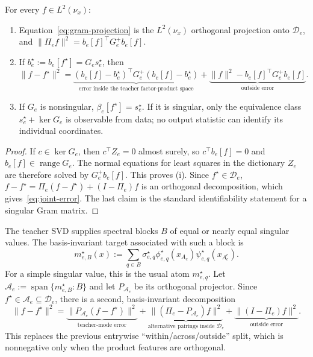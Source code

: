 \begin{proposition}\label{prop:error-decomposition}
For every $f\in L^2(\nu_x)$:
\begin{enumerate}[label=(\roman*),nosep]
\item Equation~\eqref{eq:gram-projection} is the $L^2(\nu_x)$ orthogonal projection onto
      $\mathcal D_e$, and
      $\|\Pi_e f\|^2=b_e[f]^\top G_e^+b_e[f]$.
\item If $b_e^\star:=b_e[f^\star]=G_es_e^\star$, then
\begin{equation}\label{eq:joint-error}
 \|f-f^\star\|^2
 =\underbrace{(b_e[f]-b_e^\star)^\top G_e^+(b_e[f]-b_e^\star)}_{\text{error inside the teacher factor-product space}}
 +\underbrace{\|f\|^2-b_e[f]^\top G_e^+b_e[f]}_{\text{outside error}}.
\end{equation}
\item If $G_e$ is nonsingular, $\beta_e[f^\star]=s_e^\star$.  If it is singular, only the
      equivalence class $s_e^\star+\ker G_e$ is observable from data; no output statistic can
      identify its individual coordinates.
\end{enumerate}
\end{proposition}

\begin{proof}
If $c\in\ker G_e$, then $c^\top Z_e=0$ almost surely, so $c^\top b_e[f]=0$ and
$b_e[f]\in\operatorname{range}G_e$.  The normal equations for least squares in the dictionary
$Z_e$ are therefore solved by $G_e^+b_e[f]$.  This proves (i).  Since $f^\star\in\mathcal D_e$,
$f-f^\star=\Pi_e(f-f^\star)+(I-\Pi_e)f$ is an orthogonal decomposition, which gives~\eqref{eq:joint-error}.
The last claim is the standard identifiability statement for a singular Gram matrix.
\end{proof}

The teacher SVD supplies spectral blocks $B$ of equal or nearly equal singular values.  The
basis-invariant target associated with such a block is
\begin{equation}\label{eq:block-atom}
 m_{e,B}^\star(x):=\sum_{q\in B}\sigma_{e,q}^\star
 \phi_{e,q}^\star(x_{A_e})\psi_{e,q}^\star(x_{A_e^c}).
\end{equation}
For a simple singular value, this is the usual atom $m_{e,q}^\star$.  Let
$\mathcal A_e:=\operatorname{span}\{m_{e,B}^\star:B\}$ and let $P_{\mathcal A_e}$ be its
orthogonal projector.  Since $f^\star\in\mathcal A_e\subseteq\mathcal D_e$, there is a second,
basis-invariant decomposition
\begin{equation}\label{eq:three-space-decomposition}
 \|f-f^\star\|^2
 =\underbrace{\|P_{\mathcal A_e}(f-f^\star)\|^2}_{\text{teacher-mode error}}
 +\underbrace{\|(\Pi_e-P_{\mathcal A_e})f\|^2}_{\text{alternative pairings inside }\mathcal D_e}
 +\underbrace{\|(I-\Pi_e)f\|^2}_{\text{outside error}}.
\end{equation}
This replaces the previous entrywise ``within/across/outside'' split, which is nonnegative only
when the product features are orthogonal.

